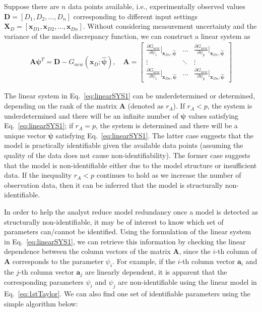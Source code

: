 \documentclass[preprint,review,12pt,3p]{elsarticle}
\begin{document}
Suppose there are $n$ data points available, i.e., experimentally observed values $\boldsymbol{D}=[D_1,D_2,...,D_n]$ corresponding to different input settings $\boldsymbol{X}_D = [\boldsymbol{x}_{D1},\boldsymbol{x}_{D2},...,\boldsymbol{x}_{Dn}]$. Without considering measurement uncertainty and the variance of the model discrepancy function, we can construct a linear system as
\begin{eqnarray}\label{eq:linearSYS1}
\boldsymbol{A} \boldsymbol{\psi}^T = \boldsymbol{D} - G_{new}(\boldsymbol{x}_D;\hat{\boldsymbol{\psi}}), \quad\boldsymbol{A} = \begin{bmatrix}
\frac{\partial{G_{new}}}{\partial{\psi_1}} \big|_{\boldsymbol{x}_{D1},\hat{\boldsymbol{\psi}}} & ... & \frac{\partial{G_{new}}}{\partial{\psi_p}} \big|_{\boldsymbol{x}_{D1},\hat{\boldsymbol{\psi}}}\\
\vdots & \ddots & \vdots \\
\frac{\partial{G_{new}}}{\partial{\psi_1}} \big|_{\boldsymbol{x}_{Dn},\hat{\boldsymbol{\psi}}} & ... & \frac{\partial{G_{new}}}{\partial{\psi_p}} \big|_{\boldsymbol{x}_{Dn},\hat{\boldsymbol{\psi}}}
\end{bmatrix}
\end{eqnarray}

The linear system in Eq.~\ref{eq:linearSYS1} can be underdetermined or determined, depending on the rank of the matrix $\boldsymbol{A}$ (denoted as $r_{A}$). If $r_{A} < p$, the system is underdetermined and there will be an infinite number of $\boldsymbol{\psi}$ values satisfying Eq.~\ref{eq:linearSYS1}; if $r_{A} = p$, the system is determined and there will be a unique vector $\boldsymbol{\psi}$ satisfying Eq.~\ref{eq:linearSYS1}. The latter case suggests that the model is practically identifiable given the available data points (assuming the quality of the data does not cause non-identifiability). The former case suggests that the model is non-identifiable either due to the model structure or insufficient data. If the inequality $r_{A} < p$ continues to hold as we increase the number of observation data, then it can be inferred that the model is structurally non-identifiable. 

In order to help the analyst reduce model redundancy once a model is detected as structurally non-identifiable, it may be of interest to know which set of parameters can/cannot be identified. Using the formulation of the linear system in Eq.~\ref{eq:linearSYS1}, we can retrieve this information by checking the linear dependence between the column vectors of the matrix $\boldsymbol{A}$, since the $i$-th column of $\boldsymbol{A}$ corresponds to the parameter $\psi_i$. For example, if the $i$-th column vector $\boldsymbol{a}_i$ and the $j$-th column vector $\boldsymbol{a}_j$ are linearly dependent, it is apparent that the corresponding parameters $\psi_i$ and $\psi_j$ are non-identifiable using the linear model in Eq.~\ref{eq:1stTaylor}. We can also find one set of identifiable parameters using the simple algorithm below:
\end{document}
